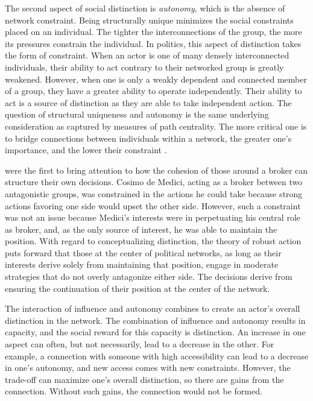 \documentclass[12pt]{article}
\begin{document}
The second aspect of social distinction is \textit{autonomy}, which is the absence of network constraint. Being structurally unique minimizes the social constraints placed on an individual. The tighter the interconnections of the group, the more its pressures constrain the individual. In politics, this aspect of distinction takes the form of constraint. When an actor is one of many densely interconnected individuals, their ability to act contrary to their networked group is greatly weakened. However, when one is only a weakly dependent and connected member of a group, they have a greater ability to operate independently. Their ability to act is a source of distinction as they are able to take independent action. The question of structural uniqueness and autonomy is the same underlying consideration as captured by measures of path centrality. The more critical one is to bridge connections between individuals within a network, the greater one's importance, and the lower their constraint \citep{burt92}. 

\citet[1263-4]{padgett_ansell94} were the first to bring attention to how the cohesion of those around a broker can structure their own decisions. Cosimo de Medici, acting as a broker between two antagonistic groups, was constrained in the actions he could take because strong actions favoring one side would upset the other side. However, such a constraint was not an issue because Medici’s interests were in perpetuating his central role as broker, and, as the only source of interest, he was able to maintain the position. With regard to conceptualizing distinction, the theory of robust action puts forward that those at the center of political networks, as long as their interests derive solely from maintaining that position, engage in moderate strategies that do not overly antagonize either side. The decisions derive from ensuring the continuation of their position at the center of the network. 

The interaction of influence and autonomy combines to create an actor’s overall distinction in the network. The combination of influence and autonomy results in capacity, and the social reward for this capacity is distinction. An increase in one aspect can often, but not necessarily, lead to a decrease in the other. For example, a connection with someone with high accessibility can lead to a decrease in one’s autonomy, and new access comes with new constraints. However, the trade-off can maximize one’s overall distinction, so there are gains from the connection. Without such gains, the connection would not be formed.








\end{document}
